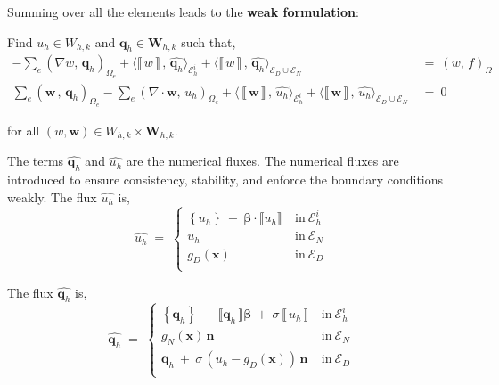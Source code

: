 \documentclass[10pt]{report}
\numberwithin{equation}{section}
\begin{document}
\noindent
Summing over all the elements leads to the \textbf{weak formulation}:

\vspace{2mm}

\noindent
Find $u_{h} \in W_{h,k}$ and $\textbf{q}_{h} \in  \textbf{W}_{h,k} $ such that,
\begin{align}
-
\sum_{e} \left( \nabla w,  \,  \textbf{q}_{h}  \right)_{\Omega_{e}}
 +
\langle  \llbracket \,  w \, \rrbracket \, , \,  \widehat{\textbf{q}_{h} } \rangle_{\mathcal{E}_{h}^{i} }
 +
\langle  \llbracket \,  w \, \rrbracket \, , \,  \widehat{\textbf{q}_{h} } \rangle_{\mathcal{E}_{D} \cup \mathcal{E}_{N}} \ &= \  
\left( w , \, f  \right)_{\Omega} \label{eq:LDG1}  \\
\sum_{e} \left( \textbf{w} \, , \, \textbf{q}_{h} \right)_{\Omega_{e}}
-
\sum_{e} \left(  \nabla \cdot \textbf{w} , \,  u_{h} \right)_{\Omega_{e}}
+  
\langle \, \llbracket \,  \textbf{w} \, \rrbracket \, ,   \, \widehat{u_{h}}
\rangle_{\mathcal{E}_{h}^{i}}
+ 
\langle  \llbracket \,  \textbf{w} \, \rrbracket \, , \,  \widehat{u_{h}}  \rangle_{\mathcal{E}_{D} \cup \mathcal{E}_{N}} \label{eq:LDG2}
\ &= \
0
\end{align}

\noindent
for all $(w,\textbf{w}) \in W_{h,k} \times \textbf{W}_{h,k}$.


\vspace{2mm}

\noindent
The terms $\widehat{\textbf{q}_{h}}$ and $\widehat{u_{h}}$ are the numerical fluxes. The numerical fluxes are introduced to ensure consistency, stability, and enforce the boundary conditions weakly.  The flux $\widehat{u_{h}}$ is,
\begin{equation} \label{eq:UFLUX}
\widehat{u_{h}} \; = \; \left\{
\begin{array}{cl}
\left\{ u_{h} \right\} \ + \ \boldsymbol \beta \cdot \llbracket u_{h} \rrbracket &  \ \text{in} \  \mathcal{E}_{h}^{i} \\
u_{h} &  \ \text{in} \ \mathcal{E}_{N}\\
g_{D}(\textbf{x})  & \ \text{in} \ \mathcal{E}_{D} \\
\end{array}
\right.
\end{equation}


\noindent
The flux $\widehat{\textbf{q}_{h}}$ is,
\begin{equation} \label{eq:QFLUX}
\widehat{\textbf{q}_{h}}  \; = \; \left\{
\begin{array}{cl}
\left\{ \textbf{q}_{h} \right\} \ - \  \llbracket \textbf{q}_{h} \, \rrbracket \boldsymbol \beta \ + \ \sigma \, \llbracket \, u_{h} \, 
\rrbracket & \ \text{in} \ \mathcal{E}_{h}^{i} \\
g_{N}(\textbf{x}) \, \textbf{n} \,  & \ \text{in} \ \mathcal{E}_{N}\\
\textbf{q}_{h} \ + \ \sigma \, \left(u_{h} - g_{D}(\textbf{x}) \right) \, \textbf{n} & \ \text{in} \ \mathcal{E}_{D} \\
\end{array}
\right.
\end{equation}
\end{document}
